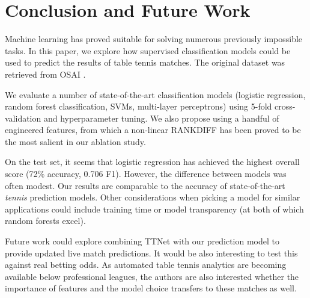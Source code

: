 \section{Conclusion and Future Work} \label{sec:conc}
Machine learning has proved suitable for solving numerous previously impossible tasks. In this paper, we explore how supervised classification models could be used to predict the results of table tennis matches.  The original dataset was retrieved from OSAI \cite{OSAI}.

We evaluate a number of state-of-the-art classification models (logistic regression, random forest classification, SVMs, multi-layer perceptrons) using 5-fold cross-validation and hyperparameter tuning. We also propose using a handful of engineered features, from which a non-linear RANKDIFF has been proved to be the most salient in our ablation study.

On the test set, it seems that logistic regression has achieved the highest overall score (72\% accuracy, 0.706 F1). However, the difference between models was often modest. Our results are comparable to the accuracy of state-of-the-art \textit{tennis} prediction models. Other considerations when picking a model for similar applications could include training time or model transparency (at both of which random forests excel). 

Future work could explore combining TTNet with our prediction model to provide updated live match predictions. It would be also interesting to test this against real betting odds. As automated table tennis analytics are becoming available below professional leagues, the authors are also interested whether the importance of features and the model choice transfers to these matches as well.


